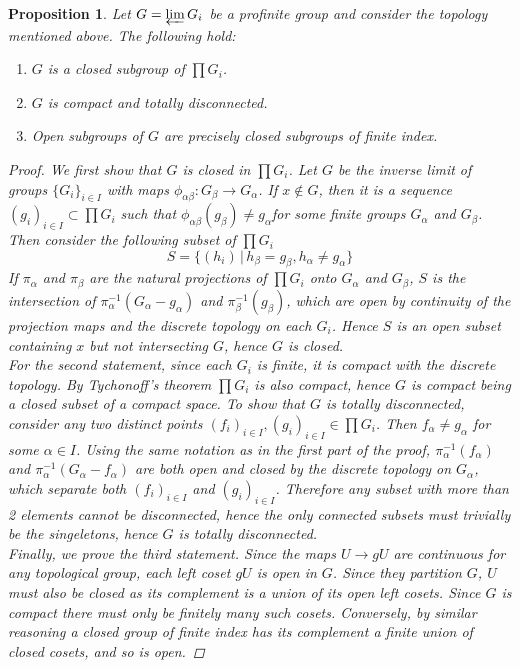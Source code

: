 \documentclass{article}
\theoremstyle{definition}
\theoremstyle{remark}
\theoremstyle{plain}
\newtheorem{proposition}[theorem]{Proposition}
\begin{document}
\begin{proposition}
	Let $G = \varprojlim G_i$ be a profinite group and consider the topology mentioned above.
	The following hold:
	\begin{enumerate}
		\item $G$ is a closed subgroup of $\prod G_i$.
		\item $G$ is compact and totally disconnected.
		\item Open subgroups of $G$ are precisely closed subgroups of finite index.
	\end{enumerate}
	
	\begin{proof}
		We first show that $G$ is closed in $\prod G_i$.
		Let $G$ be the inverse limit of groups $\{G_i\}_{i \in I}$ with maps $\phi_{\alpha \beta}: G_{\beta} \to G_{\alpha}$. 
		If $x \notin G$, then it is a sequence $(g_i)_{i \in I} \subset \prod G_i$ such that $\phi_{\alpha \beta} (g_{\beta}) \neq g_{\alpha}$for some finite groups $G_{\alpha}$ and $G_{\beta}$.
Then consider the following subset of $\prod G_i$
\[S  = \{(h_i) \,|\, h_{\beta} = g_{\beta}, h_{\alpha} \neq g_{\alpha}\}\]
If $\pi_{\alpha}$ and $\pi_{\beta}$ are the natural projections of $\prod G_i$ onto $G_{\alpha}$ and $G_{\beta}$, $S$ is the intersection of $\pi_{\alpha}^{-1}(G_{\alpha} - g_{\alpha})$ and $\pi_{\beta}^{-1}(g_{\beta})$, which are open by continuity of the projection maps and the discrete topology on each $G_i$.
Hence $S$ is an open subset containing $x$ but not intersecting $G$, hence $G$ is closed.\\
\indent For the second statement, since each $G_i$ is finite, it is compact with the discrete topology.
By Tychonoff's theorem $\prod G_i$ is also compact, hence $G$ is compact being a closed subset of a compact space.
To show that $G$ is totally disconnected, consider any two distinct points $(f_i)_{i \in I}, (g_i)_{i \in I} \in \prod G_i$.
Then $f_{\alpha} \neq g_{\alpha}$ for some $\alpha \in I$.
Using the same notation as in the first part of the proof, $\pi_{\alpha}^{-1}(f_{\alpha})$ and $\pi_{\alpha}^{-1}(G_{\alpha} - f_{\alpha})$ are both open and closed by the discrete topology on $G_{\alpha}$, which separate both $(f_i)_{i \in I}$ and $(g_i)_{i \in I}$.
Therefore any subset with more than 2 elements cannot be disconnected, hence the only connected subsets must trivially be the singeletons, hence $G$ is totally disconnected.\\
\indent Finally, we prove the third statement.
Since the maps $U \to gU$ are continuous for any topological group, each left coset $gU$ is open in $G$.
Since they partition $G$, $U$ must also be closed as its complement is a union of its open left cosets.
Since $G$ is compact there must only be finitely many such cosets.
Conversely, by similar reasoning a closed group of finite index has its complement a finite union of closed cosets, and so is open.
\end{proof}
	
\end{proposition}
\end{document}
